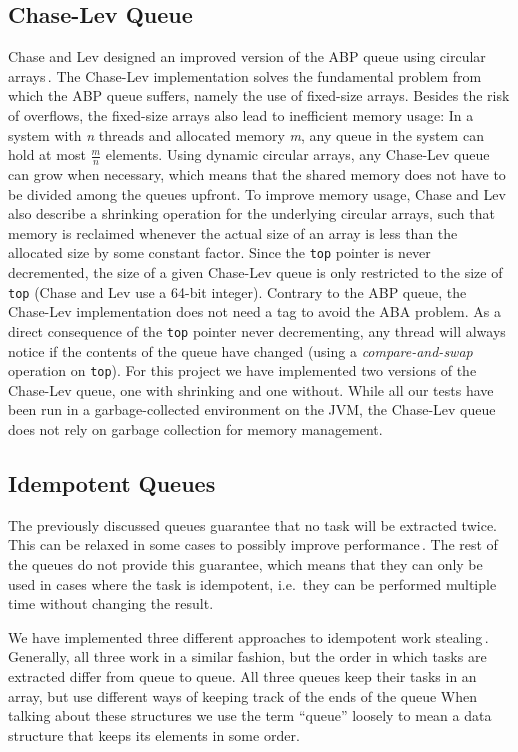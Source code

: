 \subsection{Chase-Lev Queue}
Chase and Lev designed an improved version of the ABP queue using circular arrays\,\citep{ChaseLev05}. 
The Chase-Lev implementation solves the fundamental problem from which the ABP queue suffers, namely the use of fixed-size arrays.
Besides the risk of overflows, the fixed-size arrays also lead to inefficient memory usage: In a system with \emph{n} threads and allocated memory \emph{m}, any queue in the system can hold at most $\frac{m}{n}$ elements.
Using dynamic circular arrays, any Chase-Lev queue can grow when necessary, which means that the shared memory does not have to be divided among the queues upfront.
To improve memory usage, Chase and Lev also describe a shrinking operation for the underlying circular arrays, such that memory is reclaimed whenever the actual size of an array is less than the allocated size by some constant factor.
Since the \texttt{top} pointer is never decremented, the size of a given Chase-Lev queue is only restricted to the size of \texttt{top} (Chase and Lev use a 64-bit integer).
Contrary to the ABP queue, the Chase-Lev implementation does not need a tag to avoid the ABA problem.
As a direct consequence of the \texttt{top} pointer never decrementing, any thread will always notice if the contents of the queue have changed (using a \emph{compare-and-swap} operation on \texttt{top}).
For this project we have implemented two versions of the Chase-Lev queue, one with shrinking and one without.
While all our tests have been run in a garbage-collected environment on the JVM, the Chase-Lev queue does not rely on garbage collection for memory management.

\subsection{Idempotent Queues}
\label{subsec:idempotent_queues}
The previously discussed queues guarantee that no task will be extracted twice. 
This can be relaxed in some cases to possibly improve performance\,\cite{Michael:2009:IWS:1594835.1504186}. 
The rest of the queues do not provide this guarantee, which means that they can only be used in cases where the task is idempotent, i.e.\ they can be performed multiple time without changing the result.

We have implemented three different approaches to idempotent work stealing\,\cite{Michael:2009:IWS:1594835.1504186}.
Generally, all three work in a similar fashion, but the order in which tasks are extracted differ from queue to queue.
All three queues keep their tasks in an array, but use different ways of keeping track of the ends of the queue
When talking about these structures we use the term ``queue'' loosely to mean a data structure that keeps its elements in some order.

